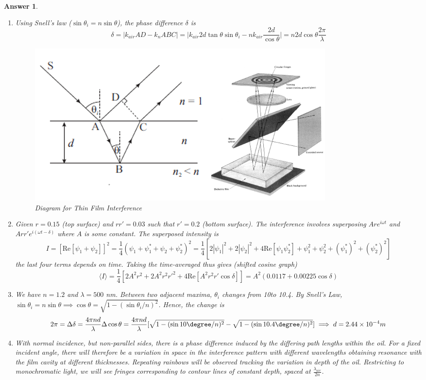 \documentclass[a4paper]{article}
\newtheorem{ans}{Answer}[subsection]
\theoremstyle{new}
\begin{document}
\begin{ans}\leavevmode
\begin{enumerate}[label=(\roman*)]
\item Using Snell's law ($\sin\theta_i=n\sin\theta$), the phase difference $\delta$ is
$$\delta=|k_{air}AD-k_nABC|=\bigg|k_{air}2d\tan\theta\sin\theta_i-nk_{air}\frac{2d}{\cos\theta}\bigg|=n2d\cos\theta\frac{2\pi}{\lambda}$$
\begin{figure}[H]
    \centering
    \includegraphics[scale=0.4]{thinfilm.PNG}
    \caption{Diagram for Thin Film Interference}
\end{figure}
\item Given $r=0.15$ (top surface) and $rr'=0.03$ such that $r'=0.2$ (bottom surface). The interference involves superposing $Are^{i\omega t}$ and $Arr'e^{i(\omega t-\delta)}$ where $A$ is some constant. The superposed intensity is
$$I=[\text{Re}[\psi_1+\psi_2]]^2=\frac{1}{4}(\psi_1+\psi_1^*+\psi_2+\psi_2^*)^2=\frac{1}{4}[2|\psi_1|^2+2|\psi_2|^2+4\text{Re}[\psi_1\psi_2^*]+\psi_1^2+\psi_2^2+(\psi_1^*)^2+(\psi_2^*)^2]$$
the last four terms depends on time. Taking the time-averaged thus gives (shifted cosine graph)
$$\langle I\rangle=\frac{1}{4}[2A^2r^2+2A^2r^2r'^2+4\text{Re}[A^2r^2r'\cos\delta]]=A^2(0.0117+0.00225\cos\delta)$$
\item We have $n=1.2$ and $\lambda=500$ nm. Between two adjacent maxima, $\theta_i$ changes from 10\degree to 10.4\degree. By Snell's Law, $\sin\theta_i=n\sin\theta\implies\cos\theta=\sqrt{1-(\sin\theta_i/n)^2}$. Hence, the change is
$$2\pi=\Delta\delta=\frac{4\pi nd}{\lambda}\Delta\cos\theta=\frac{4\pi nd}{\lambda}[\sqrt{1-(\sin10\degree/n)^2}-\sqrt{1-(\sin10.4\degree/n)^2}]\implies d=2.44\times10^{-4}m$$
\item With normal incidence, but non-parallel sides, there is a phase difference induced by the differing path lengths within the oil. For a fixed incident angle, there will therefore be a variation in space in the interference pattern with different wavelengths obtaining resonance with the film cavity at different thicknesses. Repeating rainbows will be observed tracking the variation in depth of the oil. Restricting to monochromatic light, we will see fringes corresponding to contour lines of constant depth, spaced at $\frac{\lambda_{air}}{2n}$.
\end{enumerate}
\end{ans}
\newpage
\end{document}
